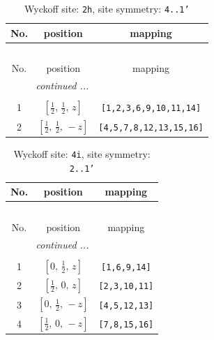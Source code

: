 \documentclass[fleqn,8pt]{jsarticle}
\begin{document}
\begin{longtable}{ccc}
\caption{Wyckoff site: {\tt 2h}, site symmetry: {\tt 4..1'}}
 \\
 \hline \hline
No. & position & mapping \\ \hline \endfirsthead

\multicolumn{2}{l}{\tablename\ \thetable{}} \\
 \hline \hline
No. & position & mapping \\ \hline \endhead

 \hline \hline
\multicolumn{2}{r}{\footnotesize\it continued ...} \\ \endfoot

 \hline \hline
\multicolumn{2}{r}{} \\ \endlastfoot

1 & $\left[ \frac{1}{2},\, \frac{1}{2},\, z \right]$ & {\tt [1,2,3,6,9,10,11,14]} \\ \hline
2 & $\left[ \frac{1}{2},\, \frac{1}{2},\, - z \right]$ & {\tt [4,5,7,8,12,13,15,16]} \\
\end{longtable}
\renewcommand{\arraystretch}{1.2}
\begin{longtable}{ccc}
\caption{Wyckoff site: {\tt 4i}, site symmetry: {\tt 2..1'}}
 \\
 \hline \hline
No. & position & mapping \\ \hline \endfirsthead

\multicolumn{2}{l}{\tablename\ \thetable{}} \\
 \hline \hline
No. & position & mapping \\ \hline \endhead

 \hline \hline
\multicolumn{2}{r}{\footnotesize\it continued ...} \\ \endfoot

 \hline \hline
\multicolumn{2}{r}{} \\ \endlastfoot

1 & $\left[ 0,\, \frac{1}{2},\, z \right]$ & {\tt [1,6,9,14]} \\ \hline
2 & $\left[ \frac{1}{2},\, 0,\, z \right]$ & {\tt [2,3,10,11]} \\ \hline
3 & $\left[ 0,\, \frac{1}{2},\, - z \right]$ & {\tt [4,5,12,13]} \\ \hline
4 & $\left[ \frac{1}{2},\, 0,\, - z \right]$ & {\tt [7,8,15,16]} \\
\end{longtable}
\renewcommand{\arraystretch}{1.2}
\end{document}
